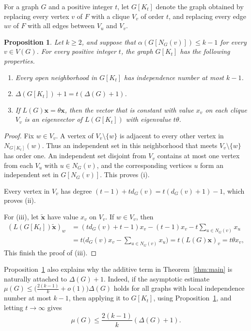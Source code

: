 \documentclass[11pt]{article}
\theoremstyle{plain}
\newtheorem{proposition}{Proposition}[section]
\theoremstyle{definition}
\numberwithin{equation}{section}
\begin{document}
For a graph $G$ and a positive integer $t$, let $G[K_t]$ denote the graph
obtained by replacing every vertex $v$ of $F$ with a clique $V_v$ of order
$t$, and replacing every edge $uv$ of $F$ with all edges between $V_u$ and
$V_v$.

\begin{proposition}\label{prop:extension}
Let $k\geq 2$, and suppose that $\alpha (G[N_G(v)])\leq k-1$ for every $v\in V(G)$.
For every positive integer $t$, the graph $G[K_t]$ has the following properties.
\begin{enumerate}
\item[$(1)$] Every open neighborhood in $G[K_t]$ has independence number at most $k-1$.
\item[$(2)$] $\Delta(G[K_t]) + 1 = t(\Delta(G)+1)$.
\item[$(3)$] If $L(G)\bm{x} = \theta\bm{x}$, then the vector that is constant with value
$x_v$ on each clique $V_v$ is an eigenvector of $L(G[K_t])$ with eigenvalue $t\theta$.
\end{enumerate}
\end{proposition}

\begin{proof}
Fix $w\in V_v$. A vertex of $V_v\setminus\{w\}$ is adjacent to every other
vertex in $N_{G[K_t]}(w)$. Thus an independent set in this neighborhood that
meets $V_v\setminus\{w\}$ has order one.  An independent set disjoint from
$V_v$ contains at most one vertex from each $V_u$ with $u\in N_G(v)$, and the
corresponding vertices $u$ form an independent set in $G[N_G(v)]$. This proves (i).

Every vertex in $V_v$ has degree $(t-1) + t d_G(v) = t (d_G(v) + 1) - 1$,
which proves (ii).

For (iii), let $\widetilde{\bm{x}}$ have value $x_v$ on $V_v$. If $w\in V_v$, then
\begin{align*}
(L(G[K_t])\widetilde{\bm{x}})_w
& = (t d_G(v) + t - 1) x_v - (t-1) x_v - t\sum_{u\in N_G(v)} x_u \\
& = t\bigg(d_G(v) x_v - \sum_{u\in N_G(v)} x_u\bigg) 
= t(L(G) \bm{x})_v = t\theta x_v,
\end{align*}
This finish the proof of (iii).
\end{proof}

Proposition~\ref{prop:extension} also explains why the additive term in
Theorem~\ref{thm:main} is naturally attached to $\Delta(G)+1$. Indeed, if the
asymptotic estimate $\mu(G)\leq\big(\frac{2(k-1)}{k} + o(1)\big)\Delta(G)$
holds for all graphs with local independence number at most $k-1$, then applying
it to $G[K_t]$, using Proposition~\ref{prop:extension}, and letting
$t\to\infty$ gives
\[
\mu(G)\leq \frac{2(k-1)}{k} (\Delta(G) + 1).
\]
\end{document}
